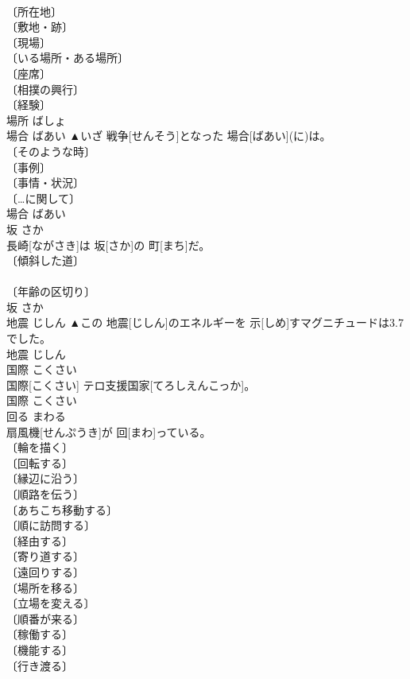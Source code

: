 \documentclass[8pt]{extreport}
\begin{document}
\begin{CJK}{UTF8}{min}
\\	〔所在地〕 
\\	〔敷地・跡〕 
\\	〔現場〕 
\\	〔いる場所・ある場所〕 
\\	〔座席〕 
\\	〔相撲の興行〕 
\\	〔経験〕 
\\	[⇒ばかず]	場所	ばしょ	
\\	場合	ばあい	▲いざ 戦争[せんそう]となった 場合[ばあい](に)は。	
\\	〔そのような時〕 
\\	〔事例〕 
\\	〔事情・状況〕 
\\	〔…に関して〕 
\\	場合	ばあい	
\\	坂	さか	
\\	長崎[ながさき]は 坂[さか]の 町[まち]だ。	
\\	〔傾斜した道〕 
\\	[⇒さかみち] 
\\	〔年齢の区切り〕 
\\	坂	さか	
\\	地震	じしん	▲この 地震[じしん]のエネルギーを 示[しめ]すマグニチュードは3.7でした。	
\\	地震	じしん	
\\	国際	こくさい	
\\	国際[こくさい] テロ支援国家[てろしえんこっか]。	
\\	国際	こくさい	
\\	回る	まわる	
\\	扇風機[せんぷうき]が 回[まわ]っている。	
\\	〔輪を描く〕 
\\	〔回転する〕 
\\	〔縁辺に沿う〕 
\\	〔順路を伝う〕 
\\	〔あちこち移動する〕 
\\	〔順に訪問する〕 
\\	〔経由する〕 
\\	〔寄り道する〕 
\\	〔遠回りする〕 
\\	〔場所を移る〕 
\\	〔立場を変える〕 
\\	〔順番が来る〕 
\\	〔稼働する〕 
\\	〔機能する〕 
\\	〔行き渡る〕 

\end{CJK}
\end{document}
